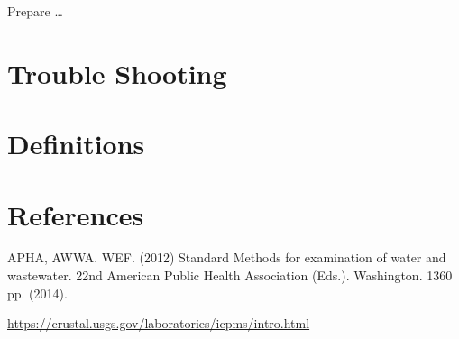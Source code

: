 \documentclass[12pt]{../SOP4_alpha}\usepackage[]{graphicx}\usepackage[]{color}
\begin{document}
\NP Prepare \dots

\NP



\section{Trouble Shooting}

\section{Definitions} \label{Definitions}

\section{References}

\NP APHA, AWWA. WEF. (2012) Standard Methods for examination of water and wastewater. 22nd American Public Health Association (Eds.). Washington. 1360 pp. (2014).

\url{https://crustal.usgs.gov/laboratories/icpms/intro.html}
\end{document}
